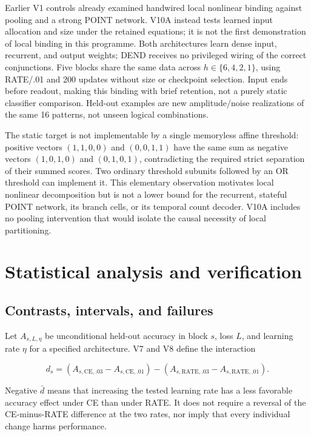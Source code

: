 \documentclass[
  10pt,
]{article}
\begin{document}
Earlier V1 controls already examined handwired local nonlinear binding
against pooling and a strong POINT network. V10A instead tests learned
input allocation and size under the retained equations; it is not the
first demonstration of local binding in this programme. Both
architectures learn dense input, recurrent, and output weights; DEND
receives no privileged wiring of the correct conjunctions. Five blocks
share the same data across \(h\in\{6,4,2,1\}\), using RATE/.01 and 200
updates without size or checkpoint selection. Input ends before readout,
making this binding with brief retention, not a purely static classifier
comparison. Held-out examples are new amplitude/noise realizations of
the same 16 patterns, not unseen logical combinations.

The static target is not implementable by a single memoryless affine
threshold: positive vectors \((1,1,0,0)\) and \((0,0,1,1)\) have the
same sum as negative vectors \((1,0,1,0)\) and \((0,1,0,1)\),
contradicting the required strict separation of their summed scores. Two
ordinary threshold subunits followed by an OR threshold can implement
it. This elementary observation motivates local nonlinear decomposition
but is not a lower bound for the recurrent, stateful POINT network, its
branch cells, or its temporal count decoder. V10A includes no pooling
intervention that would isolate the causal necessity of local
partitioning.

\section{Statistical analysis and
verification}\label{statistical-analysis-and-verification}

\subsection{Contrasts, intervals, and
failures}\label{contrasts-intervals-and-failures}

Let \(A_{s,L,\eta}\) be unconditional held-out accuracy in block \(s\),
loss \(L\), and learning rate \(\eta\) for a specified architecture. V7
and V8 define the interaction

\[d_s=(A_{s,\mathrm{CE},.03}-A_{s,\mathrm{CE},.01})
-(A_{s,\mathrm{RATE},.03}-A_{s,\mathrm{RATE},.01}).\]

Negative \(\bar d\) means that increasing the tested learning rate has a
less favorable accuracy effect under CE than under RATE. It does not
require a reversal of the CE-minus-RATE difference at the two rates, nor
imply that every individual change harms performance.
\end{document}
